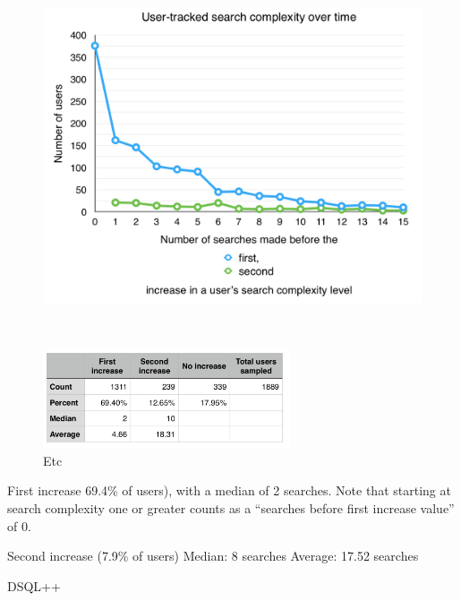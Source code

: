 \begin{figure}
  \centering

  \includegraphics[width=1.00\textwidth]{images/graph/search_dt}

  \\
  \vspace{5pt}

  \includegraphics[width=0.65\textwidth]{images/table/search_dt}

  \caption{Etc}
  \label{fig:searchtypes}
\end{figure}

First increase 69.4\% of users), with a median of 2 searches.
Note that starting at search complexity one or greater counts as a ``searches before first increase value'' of 0.

Second increase (7.9\% of users)
Median: 8 searches
Average: 17.52 searches

DSQL++